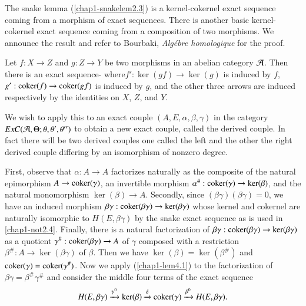The snake lemma (\ref{chap1-snakelem2.3}) is a kernel-cokernel exact
sequence coming from a morphism of exact sequences. There is another
basic kernel-cokernel exact sequence coming from a composition of two
morphisms. We announce the result and refer to Bourbaki, {\em
  Alg\'ebre homologique} for the proof.

\begin{lemma}\label{chap1-lem4.1}
Let $f:X\to Z$ and $g:Z\to Y$ be two morphisms in an abelian category
$\mathcal{A}$. Then there is an exact sequence-
{}
where\pageoriginale $f':\ker(gf)\to \ker(g)$ is induced by $f$,
$g':\operatorname{coker}(f)\to \operatorname{coker} (gf)$ is induced by $g$, and the other three
arrows are induced respectively by the identities on $X$, $Z$, and
$Y$.
\end{lemma}

We wish to apply this to an exact couple $(A,E,\alpha,\beta,\gamma)$ in
the category $ExC(\mathcal{A},\Theta;\theta,\theta',\theta'')$ to obtain a new
exact couple, called the derived couple. In fact there will be two
derived couples one called the left and the other the right derived
couple differing by an isomorphism of nonzero degree.

First, observe that $\alpha:A\to A$ factorizes naturally as the
composite of the natural epimorphism $A\to \operatorname{coker}(\gamma)$, an
invertible morphism $\alpha^{\#}:\operatorname{coker} (\gamma)\to \ker(\beta)$, and
the natural monomorphism $\ker(\beta)\to A$. Secondly, since
$(\beta\gamma)(\beta\gamma)=0$, we have an induced morphism
$\beta\gamma:\operatorname{coker} (\beta\gamma)\to \ker(\beta\gamma)$ whose kernel
and cokernel are naturally isomorphic to $H(E,\beta\gamma)$ by the
snake exact sequence as is used in \ref{chap1-not2.4}. Finally, there
is a natural factorization of $\beta\gamma:\operatorname{coker}(\beta\gamma)\to
\ker(\beta\gamma)$ as a quotient $\gamma^{\#}:\operatorname{coker} (\beta\gamma)\to
A$ of $\gamma$ composed with a restriction $\beta^{\#}:A\to
\ker(\beta\gamma)$ of $\beta$. Then we have
$\ker(\beta)=\ker(\beta^{\#})$ and
$\operatorname{coker}(\gamma)=\operatorname{coker}(\gamma^{\#})$. Now we apply
(\ref{chap1-lem4.1}) to the factorization of
$\beta\gamma=\beta^{\#}\gamma^{\#}$ and consider the middle four terms
of the exact sequence
$$
H(E,\beta\gamma)\xrightarrow{\gamma^{0}}\ker(\beta)\xrightarrow{\delta}\operatorname{coker}(\gamma)\xrightarrow{\beta^{0}}H(E,\beta\gamma).
$$

